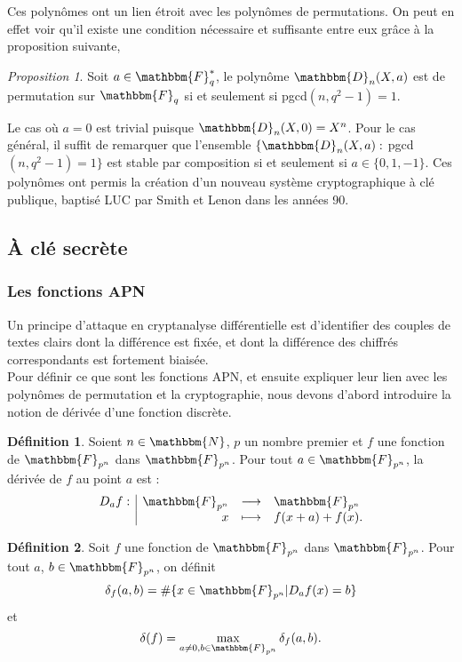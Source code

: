 \documentclass[12pt]{article}
\newcommand{\fonction}[5]{
\begin{displaymath}
\begin{array}{l|rcl}
\displaystyle
#1 : & #2 & \longrightarrow & #3 \\
    & #4 & \longmapsto & #5
\end{array}
\end{displaymath}
}
\theoremstyle{remark}\newtheorem{note}{Note}
\theoremstyle{remark}\newtheorem{nota}{Notation}
\newcommand{\F}{\mathbbm{F}}
\newtheorem{prop}{Proposition}
\theoremstyle{definition}
\newtheorem{definition}{Définition}
\begin{document}
Ces polynômes ont un lien étroit avec les polynômes de permutations. On peut en effet voir qu'il existe une condition nécessaire et suffisante entre eux grâce à la proposition suivante,
\begin{prop}
Soit $a \in \F_q^{*}$, le polynôme $\mathbbm{D}_n(X, a)$ est de permutation sur $\F_q$ si et seulement si pgcd$(n, q^2 -1) = 1$.
\end{prop}
Le cas où $a = 0$ est trivial puisque $\mathbbm{D}_n(X, 0) = X^n$. Pour le cas général, il suffit de remarquer que l'ensemble $ \{ \mathbbm{D}_n(X, a) :  $ pgcd$(n, q^2 -1) = 1 \}$ est stable par composition si et seulement si $a \in \{ 0 , 1, -1 \}$. Ces polynômes ont permis la création d'un nouveau système cryptographique à clé publique, baptisé \textsf{LUC} par Smith et Lenon dans les années 90.

\vfill \eject


\subsection{À clé secrète}

\subsubsection{Les fonctions APN}
Un principe d'attaque en cryptanalyse différentielle est d'identifier des couples de textes clairs dont la différence est fixée, et dont la différence des chiffrés correspondants est fortement biaisée.\\
Pour définir ce que sont les fonctions APN, et ensuite expliquer leur lien avec les polynômes de permutation et la cryptographie, nous devons d'abord introduire la notion de dérivée d'une fonction discrète.

\begin{definition}
Soient $n \in \mathbbm{N}$, $p$ un nombre premier et $f$ une fonction de $\mathbbm{F}_{p^n}$ dans $\mathbbm{F}_{p^n}$. Pour tout $a \in \mathbbm{F}_{p^n}$, la dérivée de $f$ au point $a$ est : \fonction{D_af}{\F_{p^n}}{\F_{p^n}}{x}{f(x+a)+f(x).}
\end{definition}

\begin{definition}
Soit $f$ une fonction de $\mathbbm{F}_{p^n}$ dans $\mathbbm{F}_{p^n}$. Pour tout $a$, $b \in \mathbbm{F}_{p^n}$, on définit 
$$\delta_f(a,b)=\# \lbrace x\in \mathbbm{F}_{p^n}|D_af(x)=b\rbrace$$
et
$$\delta(f)=\max_{a\neq 0,b\in \mathbbm{F}_{p^n}} \delta_f(a,b).$$
\end{definition}
\end{document}
